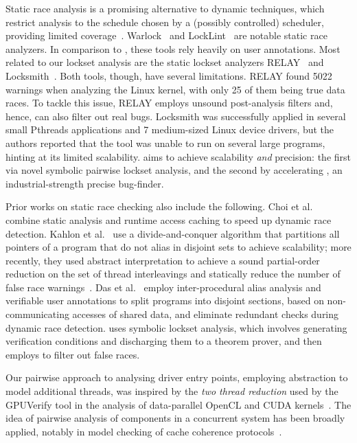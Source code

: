 Static race analysis is a promising alternative to dynamic techniques, which restrict analysis to the schedule chosen by a (possibly controlled) scheduler, providing limited coverage~\cite{musuvathi2008finding}. Warlock~\cite{sterling1993warlock} and LockLint~\cite{oracle2010locklint} are notable static race analyzers.  In comparison to \whoop, these tools rely heavily on user annotations.
%
Most related to our lockset analysis are the static lockset analyzers RELAY~\cite{voung2007relay} and Locksmith~\cite{pratikakis2006locksmith}. Both tools, though, have several limitations. RELAY found 5022 warnings when analyzing the Linux kernel, with only 25 of them being true data races. To tackle this issue, RELAY employs unsound post-analysis filters and, hence, can also filter out real bugs. Locksmith was successfully applied in several small Pthreads applications and 7 medium-sized Linux device drivers, but the authors reported that the tool was unable to run on several large programs, hinting at its limited scalability. \whoop aims to achieve scalability \emph{and} precision: the first via novel symbolic pairwise lockset analysis, and the second by accelerating \corral, an industrial-strength precise bug-finder.

Prior works on static race checking also include the following. Choi et al.~\cite{choi2002efficient} combine static analysis and runtime access caching to speed up dynamic race detection. Kahlon et al.~\cite{kahlon2007fast} use a divide-and-conquer algorithm that partitions all pointers of a program that do not alias in disjoint sets to achieve scalability; more recently, they used abstract interpretation to achieve a sound partial-order reduction on the set of thread interleavings and statically reduce the number of false race warnings~\cite{kahlon2009semantic}. Das et al.~\cite{das2015section} employ inter-procedural alias analysis and verifiable user annotations to split programs into disjoint sections, based on non-communicating accesses of shared data, and eliminate redundant checks during dynamic race detection. \whoop uses symbolic lockset analysis, which involves generating verification conditions and discharging them to a theorem prover, and then employs \corral to filter out false races. 

Our pairwise approach to analysing driver entry points, employing abstraction to model additional threads, was inspired by the \emph{two thread reduction} used by the GPUVerify tool in the analysis of data-parallel OpenCL and CUDA kernels~\cite{gpuverify,bardsley2014engineering}.  The idea of pairwise analysis of components in a concurrent system has been broadly applied, notably in model checking of cache coherence protocols~\cite{mcmillan1999verification}.
